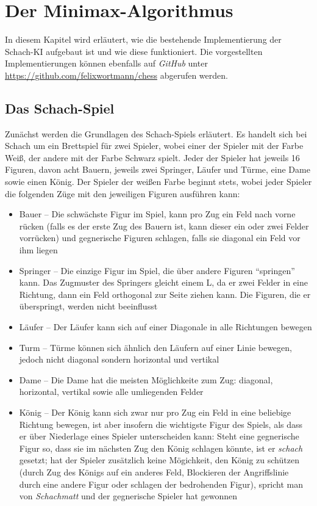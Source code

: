 
\chapter{Der Minimax-Algorithmus}
In diesem Kapitel wird erläutert, wie die bestehende Implementierung der Schach-KI aufgebaut ist und wie diese funktioniert. Die vorgestellten Implementierungen können ebenfalls auf \textit{GitHub} unter \url{https://github.com/felixwortmann/chess} abgerufen werden.

\section{Das Schach-Spiel}
Zunächst werden die Grundlagen des Schach-Spiels erläutert. Es handelt sich bei Schach um ein Brettspiel für zwei Spieler, wobei einer der Spieler mit der Farbe Weiß, der andere mit der Farbe Schwarz spielt. Jeder der Spieler hat jeweils 16 Figuren, davon acht Bauern, jeweils zwei Springer, Läufer und Türme, eine Dame sowie einen König. Der Spieler der weißen Farbe beginnt stets, wobei jeder Spieler die folgenden Züge mit den jeweiligen Figuren ausführen kann:

\begin{itemize}
    \item Bauer -- Die schwächste Figur im Spiel, kann pro Zug ein Feld nach vorne rücken (falls es der erste Zug des Bauern ist, kann dieser ein oder zwei Felder vorrücken) und gegnerische Figuren schlagen, falls sie diagonal ein Feld vor ihm liegen
    \item Springer -- Die einzige Figur im Spiel, die über andere Figuren "`springen"' kann. Das Zugmuster des Springers gleicht einem L, da er zwei Felder in eine Richtung, dann ein Feld orthogonal zur Seite ziehen kann. Die Figuren, die er überspringt, werden nicht beeinflusst
    \item Läufer -- Der Läufer kann sich auf einer Diagonale in alle Richtungen bewegen
    \item Turm -- Türme können sich ähnlich den Läufern auf einer Linie bewegen, jedoch nicht diagonal sondern horizontal und vertikal
    \item Dame -- Die Dame hat die meisten Möglichkeite zum Zug: diagonal, horizontal, vertikal sowie alle umliegenden Felder
    \item König -- Der König kann sich zwar nur pro Zug ein Feld in eine beliebige Richtung bewegen, ist aber insofern die wichtigste Figur des Spiels, als dass er über Niederlage eines Spieler unterscheiden kann: Steht eine gegnerische Figur so, dass sie im nächsten Zug den König schlagen könnte, ist er \textit{schach} gesetzt; hat der Spieler zusätzlich keine Mögichkeit, den König zu schützen (durch Zug des Königs auf ein anderes Feld, Blockieren der Angriffslinie durch eine andere Figur oder schlagen der bedrohenden Figur), spricht man von \textit{Schachmatt} und der gegnerische Spieler hat gewonnen
\end{itemize}

